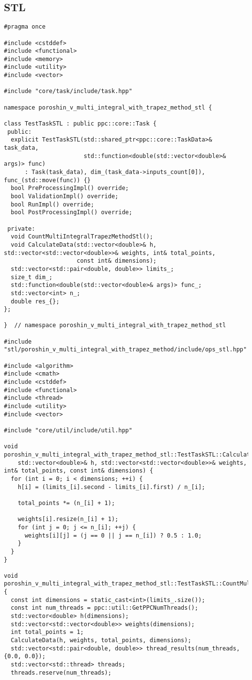 \documentclass[12pt]{article}
\begin{document}
\subsection*{STL}
\begin{lstlisting}
#pragma once

#include <cstddef>
#include <functional>
#include <memory>
#include <utility>
#include <vector>

#include "core/task/include/task.hpp"

namespace poroshin_v_multi_integral_with_trapez_method_stl {

class TestTaskSTL : public ppc::core::Task {
 public:
  explicit TestTaskSTL(std::shared_ptr<ppc::core::TaskData>& task_data,
                       std::function<double(std::vector<double>& args)> func)
      : Task(task_data), dim_(task_data->inputs_count[0]), func_(std::move(func)) {}
  bool PreProcessingImpl() override;
  bool ValidationImpl() override;
  bool RunImpl() override;
  bool PostProcessingImpl() override;

 private:
  void CountMultiIntegralTrapezMethodStl();
  void CalculateData(std::vector<double>& h, std::vector<std::vector<double>>& weights, int& total_points,
                     const int& dimensions);
  std::vector<std::pair<double, double>> limits_;
  size_t dim_;
  std::function<double(std::vector<double>& args)> func_;
  std::vector<int> n_;
  double res_{};
};

}  // namespace poroshin_v_multi_integral_with_trapez_method_stl

#include "stl/poroshin_v_multi_integral_with_trapez_method/include/ops_stl.hpp"

#include <algorithm>
#include <cmath>
#include <cstddef>
#include <functional>
#include <thread>
#include <utility>
#include <vector>

#include "core/util/include/util.hpp"

void poroshin_v_multi_integral_with_trapez_method_stl::TestTaskSTL::CalculateData(
    std::vector<double>& h, std::vector<std::vector<double>>& weights, int& total_points, const int& dimensions) {
  for (int i = 0; i < dimensions; ++i) {
    h[i] = (limits_[i].second - limits_[i].first) / n_[i];

    total_points *= (n_[i] + 1);

    weights[i].resize(n_[i] + 1);
    for (int j = 0; j <= n_[i]; ++j) {
      weights[i][j] = (j == 0 || j == n_[i]) ? 0.5 : 1.0;
    }
  }
}

void poroshin_v_multi_integral_with_trapez_method_stl::TestTaskSTL::CountMultiIntegralTrapezMethodStl() {
  const int dimensions = static_cast<int>(limits_.size());
  const int num_threads = ppc::util::GetPPCNumThreads();
  std::vector<double> h(dimensions);
  std::vector<std::vector<double>> weights(dimensions);
  int total_points = 1;
  CalculateData(h, weights, total_points, dimensions);
  std::vector<std::pair<double, double>> thread_results(num_threads, {0.0, 0.0});
  std::vector<std::thread> threads;
  threads.reserve(num_threads);


\end{lstlisting}
\end{document}
